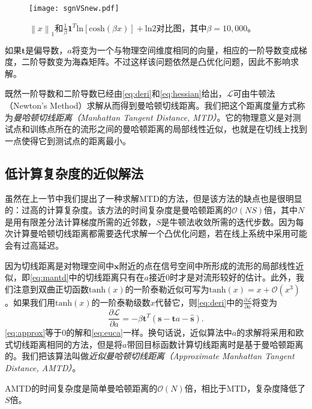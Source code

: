 \begin{figure}[htb]
	\centering
	\texttt{[image: sgnVSnew.pdf]}
	\caption{${\left\| x \right\|}_1$和$\frac{1}{\beta}\mathbf{1}^T\mathrm{ln}\left[ \mathrm{cosh} \left( \beta x \right) \right] + \mathrm{ln}2$对比图，其中$\beta=10,000$。}
	\label{fig:sgnVSnew}
\end{figure}

如果$\mathbf{t}$是偏导数，$a$将变为一个与物理空间维度相同的向量，相应的一阶导数变成梯度，二阶导数变为海森矩阵。不过这样该问题依然是凸优化问题，因此不影响求解。

既然一阶导数和二阶导数已经由\eqref{eq:deri}和\eqref{eq:hessian}给出，$\mathcal{L}$可由牛顿法（Newton's Method）求解从而得到曼哈顿切线距离。我们把这个距离度量方式称为\textit{曼哈顿切线距离（Manhattan Tangent Distance, MTD）}。它的物理意义是对测试点和训练点所在的流形之间的曼哈顿距离的局部线性近似，也就是在切线上找到一点使得它到测试点的距离最小。

\subsection{低计算复杂度的近似解法}

虽然在上一节中我们提出了一种求解MTD的方法，但是该方法的缺点也是很明显的：过高的计算复杂度。该方法的时间复杂度是曼哈顿距离的$\mathcal{O}(NS)$倍，其中$N$是用有限差分法计算梯度所需的近邻数，$S$是牛顿法收敛所需的迭代步数。因为每次计算曼哈顿切线距离都需要迭代求解一个凸优化问题，若在线上系统中采用可能会有过高延迟。

因为切线距离是对物理空间中$\mathbf{x}$附近的点在信号空间中所形成的流形的局部线性近似，即\eqref{eq:mantd}中的切线距离只有在$a$接近0时才是对流形较好的估计。此外，我们注意到双曲正切函数$\mathrm{tanh}(x)$的一阶泰勒近似可写为$\mathrm{tanh}(x) = x + \mathcal{O}\left( x^3 \right)$。如果我们用$\mathrm{tanh}(x)$的一阶泰勒级数$x$代替它，则\eqref{eq:deri}中的$\frac{\partial \mathcal{L}}{\partial a}$将变为
\begin{equation}
\frac{\partial \mathcal{L}}{\partial a} = -\beta \mathbf{t}^T \left( \mathbf{s} - \mathbf{t}a - \widehat{\mathbf{s}} \right). \label{eq:approx}
\end{equation}
\eqref{eq:approx}等于0的解和\eqref{eq:euca}一样。换句话说，近似算法中$a$的求解将采用和欧式切线距离相同的方法，但是将$a$带回目标函数计算切线距离时是基于曼哈顿距离的。我们把该算法叫做\textit{近似曼哈顿切线距离（Approximate Manhattan Tangent Distance, AMTD）}。

AMTD的时间复杂度是简单曼哈顿距离的$\mathcal{O}(N)$倍，相比于MTD，复杂度降低了$S$倍。

